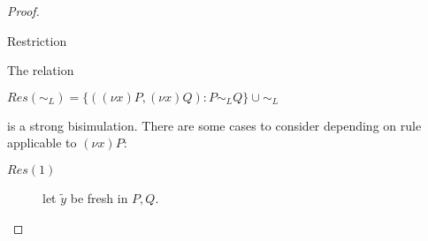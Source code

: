 \begin{proposition}
\begin{proof}
\begin{description}
	    \end{description}
    \begin{description}
      \item[Restriction] 
    \end{description}
	The relation 
	\begin{center}
	  $Res(\sim_{L})=\{((\nu x)P,(\nu x)Q): P\sim_{L}Q\}\cup \sim_{L}$ 
	\end{center}
	is a strong bisimulation. There are some cases to consider depending on rule applicable to $(\nu x)P$:
	\begin{description}
	  \item[$Res(1)$]
	    let $\tilde{y}$ be fresh in $P,Q$.

\end{description}
\end{proof}
\end{proposition}
